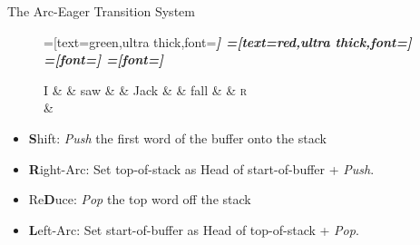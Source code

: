\documentclass{lecture}
\begin{document}
\begin{plain}{The Arc-Eager Transition System}
\begin{figure}
    \centering
    \begin{dependency}[theme=simple]
    =[text=green,ultra thick,font=\bfseries\itshape]
    =[text=red,ultra thick,font=\bfseries\itshape]
    =[font=\bfseries\itshape]
    =[font=\itshape]
    \begin{deptext}[column sep=.075cm, row sep=.1ex]
        I \&           \& saw \&          \& Jack       \& \& fall   \& \& \textsc{r} \\
         \& \\
    \end{deptext}
\end{dependency}
\end{figure}
    \begin{itemize}
        \item \textbf{S}hift: \emph{Push} the first word of the buffer onto the stack
    \item \textbf{R}ight-Arc: Set top-of-stack as Head of start-of-buffer + \emph{Push}.
    \item Re\textbf{D}uce: \emph{Pop} the top word off the stack
    \item \textbf{L}eft-Arc: Set start-of-buffer as Head of top-of-stack + \emph{Pop}.
    \end{itemize}

\end{plain}
\end{document}
